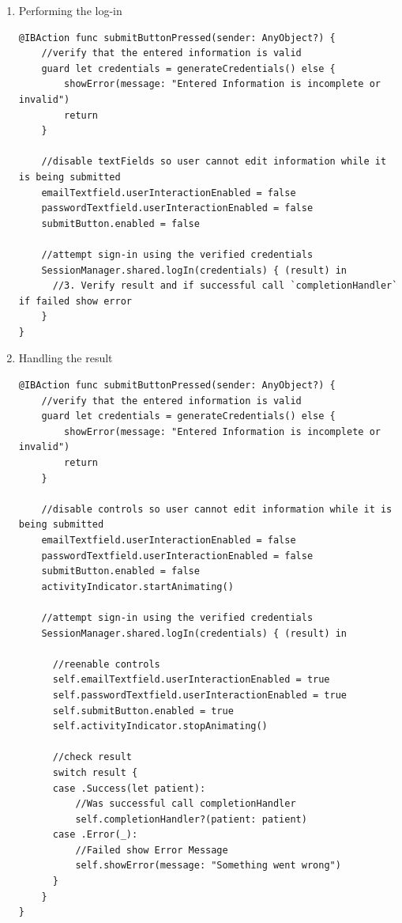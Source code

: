 \documentclass{article}
\begin{document}
\begin{enumerate}
\item{Performing the log-in}\label{performing-the-log-in}

\begin{verbatim}
@IBAction func submitButtonPressed(sender: AnyObject?) {
    //verify that the entered information is valid
    guard let credentials = generateCredentials() else {
        showError(message: "Entered Information is incomplete or invalid")
        return
    }

    //disable textFields so user cannot edit information while it is being submitted
    emailTextfield.userInteractionEnabled = false
    passwordTextfield.userInteractionEnabled = false
    submitButton.enabled = false

    //attempt sign-in using the verified credentials
    SessionManager.shared.logIn(credentials) { (result) in
      //3. Verify result and if successful call `completionHandler` if failed show error
    }
}
\end{verbatim}
\item{Handling the result}\label{handling-the-result}

\begin{verbatim}
@IBAction func submitButtonPressed(sender: AnyObject?) {
    //verify that the entered information is valid
    guard let credentials = generateCredentials() else {
        showError(message: "Entered Information is incomplete or invalid")
        return
    }

    //disable controls so user cannot edit information while it is being submitted
    emailTextfield.userInteractionEnabled = false
    passwordTextfield.userInteractionEnabled = false
    submitButton.enabled = false
    activityIndicator.startAnimating()

    //attempt sign-in using the verified credentials
    SessionManager.shared.logIn(credentials) { (result) in

      //reenable controls
      self.emailTextfield.userInteractionEnabled = true
      self.passwordTextfield.userInteractionEnabled = true
      self.submitButton.enabled = true
      self.activityIndicator.stopAnimating()

      //check result
      switch result {
      case .Success(let patient):
          //Was successful call completionHandler
          self.completionHandler?(patient: patient)
      case .Error(_):
          //Failed show Error Message
          self.showError(message: "Something went wrong")
      }
    }
}
\end{verbatim}

\end{enumerate}
\end{document}
